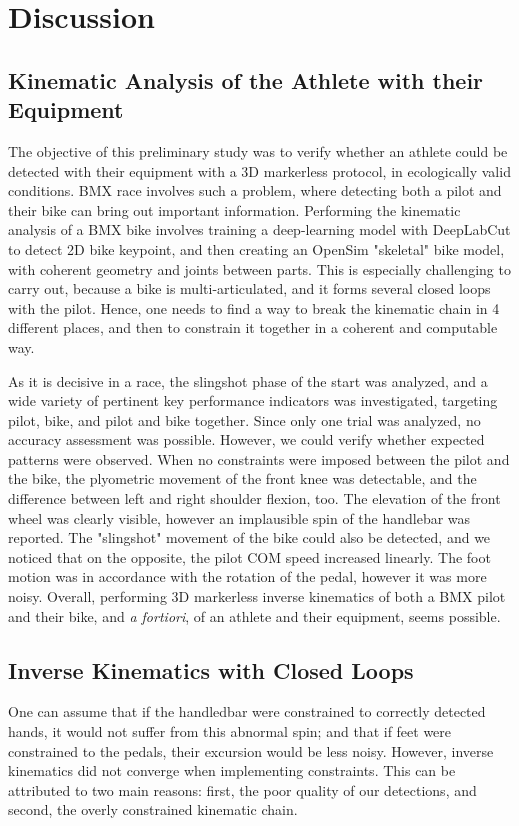 \FloatBarrier
\section{Discussion}
\subsection{Kinematic Analysis of the Athlete with their Equipment}
The objective of this preliminary study was to verify whether an athlete could be detected with their equipment with a 3D markerless protocol, in ecologically valid conditions. BMX race involves such a problem, where detecting both a pilot and their bike can bring out important information. Performing the kinematic analysis of a BMX bike involves training a deep-learning model with DeepLabCut to detect 2D bike keypoint, and then creating an OpenSim "skeletal" bike model, with coherent geometry and joints between parts. This is especially challenging to carry out, because a bike is multi-articulated, and it forms several closed loops with the pilot. Hence, one needs to find a way to break the kinematic chain in 4 different places, and then to constrain it together in a coherent and computable way.

As it is decisive in a race, the slingshot phase of the start was analyzed, and a wide variety of pertinent key performance indicators was investigated, targeting pilot, bike, and pilot and bike together. Since only one trial was analyzed, no accuracy assessment was possible. However, we could verify whether expected patterns were observed. When no constraints were imposed between the pilot and the bike, the plyometric movement of the front knee was detectable, and the difference between left and right shoulder flexion, too. The elevation of the front wheel was clearly visible, however an implausible spin of the handlebar was reported. The "slingshot" movement of the bike could also be detected, and we noticed that on the opposite, the pilot COM speed increased linearly. The foot motion was in accordance with the rotation of the pedal, however it was more noisy. Overall, performing 3D markerless inverse kinematics of both a BMX pilot and their bike, and \emph{a fortiori}, of an athlete and their equipment, seems possible.


\subsection{Inverse Kinematics with Closed Loops}
One can assume that if the handledbar were constrained to correctly detected hands, it would not suffer from this abnormal spin; and that if feet were constrained to the pedals, their excursion would be less noisy. However, inverse kinematics did not converge when implementing constraints. This can be attributed to two main reasons: first, the poor quality of our detections, and second, the overly constrained kinematic chain. 

